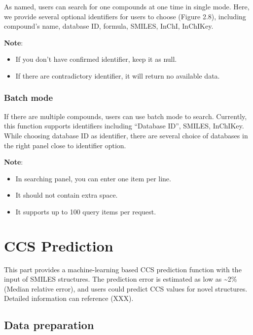 \documentclass[12pt,]{book}
\providecommand{\tightlist}{%
  \setlength{\itemsep}{0pt}\setlength{\parskip}{0pt}}
\theoremstyle{definition}
\theoremstyle{definition}
\theoremstyle{definition}
\theoremstyle{remark}
\begin{document}
As named, users can search for one compounds at one time in single mode.
Here, we provide several optional identifiers for users to choose
(Figure 2.8), including compound's name, database ID, formula, SMILES,
InChI, InChIKey.

\textbf{Note}:

\begin{itemize}
\tightlist
\item
  If you don't have confirmed identifier, keep it as null.
\item
  If there are contradictory identifier, it will return no available
  data.
\end{itemize}

\subsection{Batch mode}\label{batch-mode}

If there are multiple compounds, users can use batch mode to search.
Currently, this function supports identifiers including ``Database ID'',
SMILES, InChIKey. While choosing database ID as identifier, there are
several choice of databases in the right panel close to identifier
option.

\textbf{Note}:

\begin{itemize}
\tightlist
\item
  In searching panel, you can enter one item per line.
\item
  It should not contain extra space.
\item
  It supports up to 100 query items per request.
\end{itemize}

\chapter{CCS Prediction}\label{ccsprediction}

This part provides a machine-learning based CCS prediction function with
the input of SMILES structures. The prediction error is estimated as low
as \textasciitilde{}2\% (Median relative error), and users could predict
CCS values for novel structures. Detailed information can reference
(XXX).

\section{Data preparation}\label{data-preparation}
\end{document}
